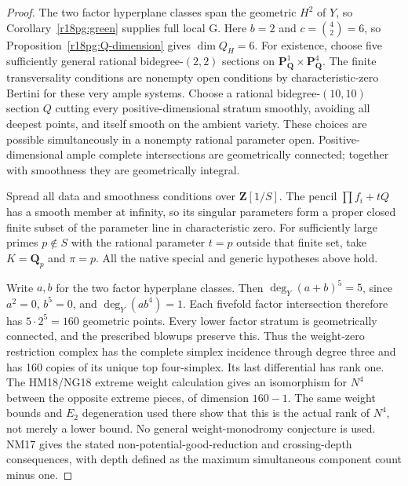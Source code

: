 \begin{proof}
The two factor hyperplane classes span the geometric $H^2$ of $Y$,
so Corollary~\ref{r18pg:green} supplies full local G.
Here $b=2$ and $c=\binom42=6$, so
Proposition~\ref{r18pg:Q-dimension} gives $\dim Q_H=6$.
For existence,
choose five sufficiently general rational bidegree-$(2,2)$ sections
on $\mathbf P^1_{\mathbf Q}\times\mathbf P^4_{\mathbf Q}$.
The finite transversality conditions are nonempty open conditions
by characteristic-zero Bertini for these very ample systems.
Choose a rational bidegree-$(10,10)$ section $Q$ cutting every
positive-dimensional stratum smoothly, avoiding all deepest points,
and itself smooth on the ambient variety.  These choices are
possible simultaneously in a nonempty rational parameter open.
Positive-dimensional ample complete intersections are geometrically
connected; together with smoothness they are geometrically integral.

Spread all data and smoothness conditions over $\mathbf Z[1/S]$.
The pencil $\prod f_i+tQ$ has a smooth member at infinity, so its
singular parameters form a proper closed finite subset of the
parameter line in characteristic zero.  For sufficiently large
primes $p\notin S$ with the rational parameter $t=p$ outside that
finite set, take $K=\mathbf Q_p$ and $\pi=p$.  All the native special
and generic hypotheses above hold.

Write $a,b$ for the two factor hyperplane classes.  Then
$\deg_Y(a+b)^5=5$, since $a^2=0$, $b^5=0$, and
$\deg_Y(ab^4)=1$.  Each fivefold factor intersection therefore
has $5\cdot2^5=160$ geometric points.  Every lower factor stratum
is geometrically connected, and the prescribed blowups preserve
this.  Thus the weight-zero restriction complex has the complete
simplex incidence through degree three and has 160 copies of its
unique top four-simplex.  Its last differential has rank one.
The HM18/NG18 extreme weight calculation gives an isomorphism for
$N^4$ between the opposite extreme pieces, of dimension $160-1$.
The same weight bounds and $E_2$ degeneration used there show that
this is the actual rank of $N^4$, not merely a lower bound.  No
general weight-monodromy conjecture is used.  NM17 gives the stated
non-potential-good-reduction and crossing-depth consequences, with
depth defined as the maximum simultaneous component count minus one.


\end{proof}
